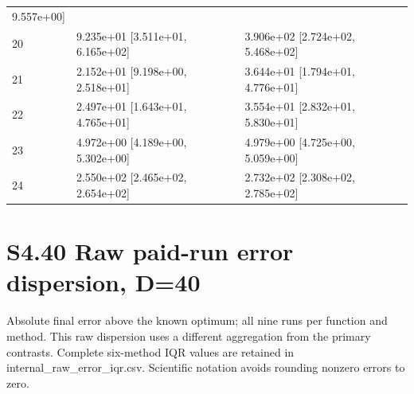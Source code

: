 \documentclass[11pt,a4paper]{article}
\begin{document}
\begin{minipage}{\linewidth}
\begin{longtable}[]{@{}lll@{}}
9.557e+00{]} \\
20 & 9.235e+01 {[}3.511e+01, 6.165e+02{]} & 3.906e+02 {[}2.724e+02,
5.468e+02{]} \\
21 & 2.152e+01 {[}9.198e+00, 2.518e+01{]} & 3.644e+01 {[}1.794e+01,
4.776e+01{]} \\
22 & 2.497e+01 {[}1.643e+01, 4.765e+01{]} & 3.554e+01 {[}2.832e+01,
5.830e+01{]} \\
23 & 4.972e+00 {[}4.189e+00, 5.302e+00{]} & 4.979e+00 {[}4.725e+00,
5.059e+00{]} \\
24 & 2.550e+02 {[}2.465e+02, 2.654e+02{]} & 2.732e+02 {[}2.308e+02,
2.785e+02{]} \\
\bottomrule
\end{longtable}

\end{minipage}\par

\newpage

\hypertarget{s4.40-raw-paid-run-error-dispersion-d40}{%
\section{S4.40 Raw paid-run error dispersion,
D=40}\label{s4.40-raw-paid-run-error-dispersion-d40}}

Absolute final error above the known optimum; all nine runs per function
and method. This raw dispersion uses a different aggregation from the
primary contrasts. Complete six-method IQR values are retained in
internal\_raw\_error\_iqr.csv. Scientific notation avoids rounding
nonzero errors to zero.
\end{document}
